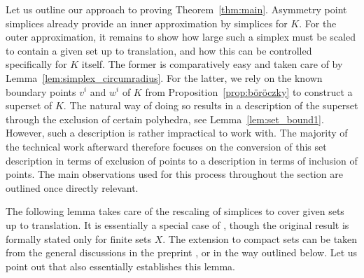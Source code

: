 \documentclass{amsart}
\begin{document}
Let us outline our approach to proving Theorem~\ref{thm:main}.
Asymmetry point simplices already provide an inner approximation by simplices for $K$.
For the outer approximation,
it remains to show how large such a simplex must be scaled to contain a given set up to translation,
and how this can be controlled specifically for $K$ itself.
The former is comparatively easy and taken care of by Lemma~\ref{lem:simplex_circumradius}.
For the latter, we rely on the known boundary points $v^i$ and $w^i$ of $K$ from Proposition~\ref{prop:böröczky} to construct a superset of $K$.
The natural way of doing so results in a description of the superset through the exclusion of certain polyhedra, see Lemma~\ref{lem:set_bound1}.
However, such a description is rather impractical to work with.
The majority of the technical work afterward therefore focuses on the conversion of this set description in terms of exclusion of points
to a description in terms of inclusion of points.
The main observations used for this process throughout the section are outlined once directly relevant.

The following lemma takes care of the rescaling of simplices to cover given sets up to translation.
It is essentially a special case of \cite[Proposition~$6$]{2026:BryantTupper}, though the original result is formally stated only for finite sets $X$.
The extension to compact sets can be taken from the general discussions in the preprint \cite{2026:BryantTupper}, or in the way outlined below.
Let us point out that \cite[Lemma~$12$]{2026:BakaevYehudayoff} also essentially establishes this lemma.
\end{document}
